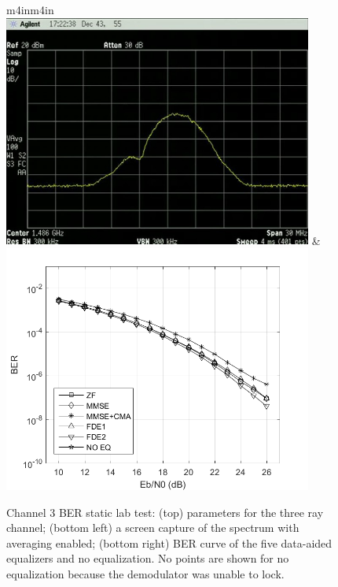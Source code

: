 \begin{figure}
\begin{center}
\begin{tabular}{m{4in}m{4in}}
\\[54pt]
\includegraphics[width=4in]{figures/eq_GPUimplementation/BER3.jpg}
&
\includegraphics[width=4in]{figures/myPNGs/BER3.png}
\end{tabular}
\end{center}
\caption{Channel 3 BER static lab test:
(top) parameters for the three ray channel;
(bottom left) a screen capture of the spectrum with averaging enabled;
(bottom right) BER curve of the five data-aided equalizers and no equalization.
No points are shown for no equalization because the demodulator was unable to lock.}
\label{fig:BER3}
\end{figure}
